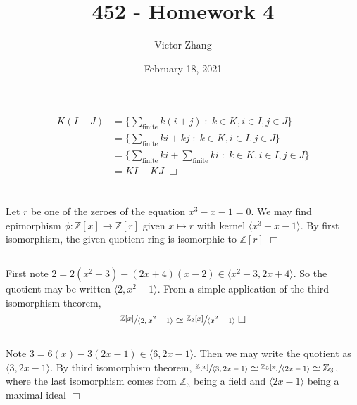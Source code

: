 \documentclass{article}
\title{452 - Homework 4}
\author{Victor Zhang}
\date{February 18, 2021}
\begin{document}
\maketitle

\section{}
\begin{equation*}
\begin{split}
K(I+J) &= \{\sum_{\mathrm{finite}}k(i+j) \;:\; k \in K, i \in I, j \in J\}\\
&= \{\sum_{\mathrm{finite}}ki+kj \;:\; k \in K, i \in I, j \in J\}\\
&= \{\sum_{\mathrm{finite}}ki + \sum_{\mathrm{finite}}ki \;:\; k \in K, i \in I, j \in J\}\\
&= KI + KJ \; \Box
\end{split}
\end{equation*}

\section{}
\subsection{}
Let $r$ be one of the zeroes of the equation $x^3-x-1=0$. We may find epimorphism $\phi: \mathbb{Z}[x] \to \mathbb{Z}[r]$ given $x\mapsto r$ with kernel $\langle x^3-x-1 \rangle$. By first isomorphism, the given quotient ring is isomorphic to $\mathbb{Z}[r]$ $\Box$
\subsection{}
First note $2 = 2(x^2-3) - (2x+4)(x-2) \in \langle x^2-3,2x+4 \rangle$. So the quotient may be written $\langle 2,x^2-1 \rangle$. From a simple application of the third isomorphism theorem,
$$\sfrac{\mathbb{Z}[x]}{\langle 2,x^2-1 \rangle} \simeq \sfrac{\mathbb{Z}_2[x]}{\langle x^2-1 \rangle} \; \Box$$
\subsection{}
Note $3 = 6(x) - 3(2x-1) \in \langle 6,2x-1 \rangle$. Then we may write the quotient as $\langle 3,2x-1 \rangle$. By third isomorphism theorem, $\sfrac{\mathbb{Z}[x]}{\langle 3,2x-1 \rangle} \simeq \sfrac{\mathbb{Z}_3[x]}{\langle 2x-1 \rangle} \simeq \mathbb{Z}_3$, where the last isomorphism comes from $\mathbb{Z}_3$ being a field and $\langle 2x-1 \rangle$ being a maximal ideal $\Box$
\end{document}
